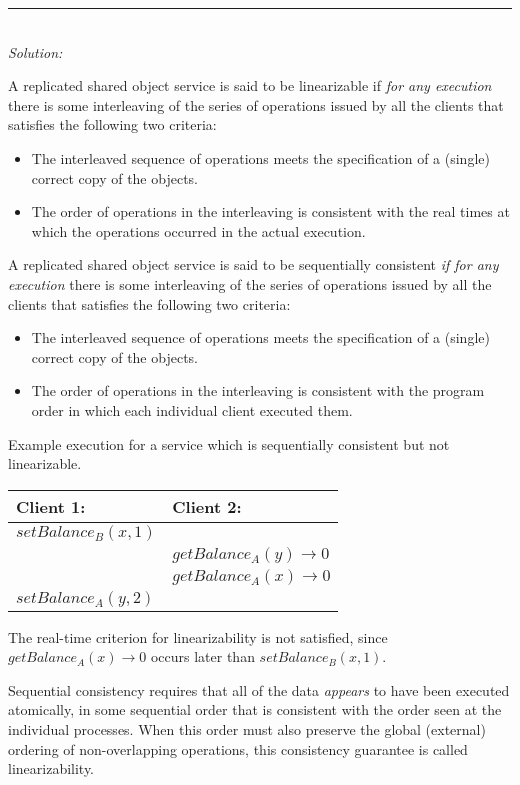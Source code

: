 \documentclass[a4paper]{article}
\newcommand{\horrule}[1]{\rule{\linewidth}{#1}} %
\newcommand{\solution}[1]{\horrule{0.5pt}\\[3pt]\textit{Solution: }\\\begin{minipage}{\textwidth}#1\end{minipage}}
\newcommand{\highlight}[1]{{\color{blue}#1}}
\begin{document}
\solution{
  A replicated shared object service is said to be
  \highlight{linearizable} if \textit{for any execution} there is
  some interleaving of the series of operations issued by all the
  clients that satisfies the following two criteria:
  \begin{itemize}
    \item The interleaved sequence of operations meets the
      specification of a (single) correct copy of the objects.
    \item The order of operations in the interleaving is consistent
      with the \highlight{real times at which the operations
        occurred in the actual execution.}
  \end{itemize}

  A replicated shared object service is said to be
  \highlight{sequentially consistent} \textit{if for any
    execution} there is some interleaving of the series of operations
  issued by all the clients that satisfies the following two criteria:
  \begin{itemize}
    \item The interleaved sequence of operations meets the
      specification of a (single) correct copy of the objects.
    \item The order of operations in the interleaving is consistent
      with the \highlight{program order in which each individual
        client executed them.}
  \end{itemize}

  \begin{center}
    Example execution for a service which is sequentially consistent
    but not linearizable.\\
    \begin{tabular}{| l | l |}\hline
      Client 1: & Client 2: \\\hline
      $setBalance_B(x, 1)$ &\\
      & $getBalance_A(y) \rightarrow 0$\\
      & $getBalance_A(x) \rightarrow 0$\\
      $setBalance_A(y, 2)$ &\\\hline
    \end{tabular}
    The real-time criterion for linearizability is not satisfied,
    since $getBalance_A(x) \rightarrow 0$ occurs later than
    $setBalance_B(x,1)$.\\
  \end{center}

  Sequential consistency requires that all of the data
  \textit{appears} to have been executed atomically, in some sequential
  order that is consistent with the order seen at the individual
  processes. When this order must also preserve the global (external)
  ordering of non-overlapping operations, this consistency guarantee is
  called linearizability.
}
\end{document}
